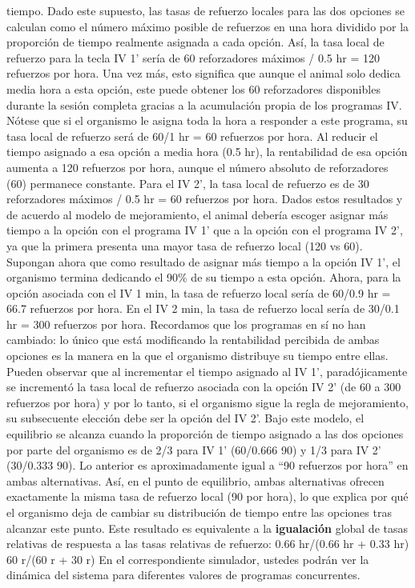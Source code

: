 \documentclass[
  a4paper,
  DIV=11,
  numbers=noendperiod]{scrreprt}
\begin{document}
tiempo. Dado este supuesto, las tasas de refuerzo locales para las dos
opciones se calculan como el número máximo posible de refuerzos en una
hora dividido por la proporción de tiempo realmente asignada a cada
opción. Así, la tasa local de refuerzo para la tecla IV 1' sería de 60
reforzadores máximos / 0.5 hr = 120 refuerzos por hora. Una vez más,
esto significa que aunque el animal solo dedica media hora a esta
opción, este puede obtener los 60 reforzadores disponibles durante la
sesión completa gracias a la acumulación propia de los programas IV.
Nótese que si el organismo le asigna toda la hora a responder a este
programa, su tasa local de refuerzo será de 60/1 hr = 60 refuerzos por
hora. Al reducir el tiempo asignado a esa opción a media hora (0.5 hr),
la rentabilidad de esa opción aumenta a 120 refuerzos por hora, aunque
el número absoluto de reforzadores (60) permanece constante. Para el IV
2', la tasa local de refuerzo es de 30 reforzadores máximos / 0.5 hr =
60 refuerzos por hora. Dados estos resultados y de acuerdo al modelo de
mejoramiento, el animal debería escoger asignar más tiempo a la opción
con el programa IV 1' que a la opción con el programa IV 2', ya que la
primera presenta una mayor tasa de refuerzo local (120 vs 60). Supongan
ahora que como resultado de asignar más tiempo a la opción IV 1', el
organismo termina dedicando el 90\% de su tiempo a esta opción. Ahora,
para la opción asociada con el IV 1 min, la tasa de refuerzo local sería
de 60/0.9 hr = 66.7 refuerzos por hora. En el IV 2 min, la tasa de
refuerzo local sería de 30/0.1 hr = 300 refuerzos por hora. Recordamos
que los programas en sí no han cambiado: lo único que está modificando
la rentabilidad percibida de ambas opciones es la manera en la que el
organismo distribuye su tiempo entre ellas. Pueden observar que al
incrementar el tiempo asignado al IV 1', paradójicamente se incrementó
la tasa local de refuerzo asociada con la opción IV 2' (de 60 a 300
refuerzos por hora) y por lo tanto, si el organismo sigue la regla de
mejoramiento, su subsecuente elección debe ser la opción del IV 2'. Bajo
este modelo, el equilibrio se alcanza cuando la proporción de tiempo
asignado a las dos opciones por parte del organismo es de 2/3 para IV 1'
(60/0.666 90) y 1/3 para IV 2' (30/0.333 90). Lo anterior es
aproximadamente igual a ``90 refuerzos por hora'' en ambas alternativas.
Así, en el punto de equilibrio, ambas alternativas ofrecen exactamente
la misma tasa de refuerzo local (90 por hora), lo que explica por qué el
organismo deja de cambiar su distribución de tiempo entre las opciones
tras alcanzar este punto. Este resultado es equivalente a la
\textbf{igualación} global de tasas relativas de respuesta a las tasas
relativas de refuerzo: 0.66 hr/(0.66 hr + 0.33 hr) 60 r/(60 r + 30 r) En
el correspondiente simulador, ustedes podrán ver la dinámica del sistema
para diferentes valores de programas concurrentes.
\end{document}
